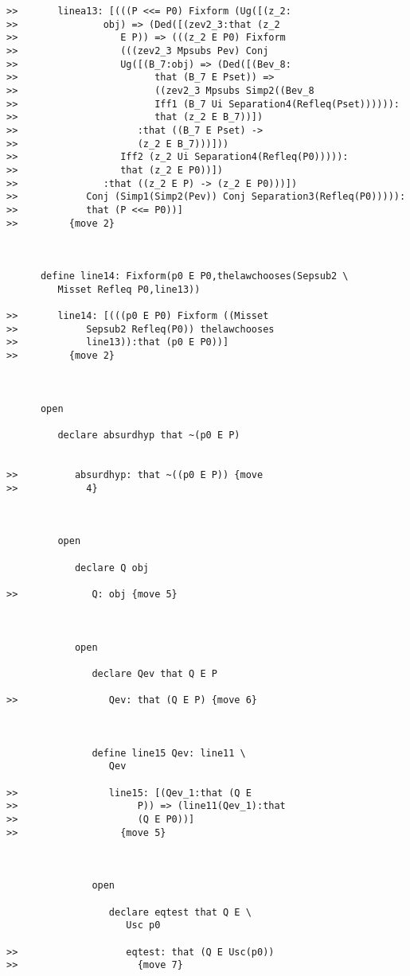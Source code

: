 \documentclass[12pt]{article}
\begin{document}
\begin{verbatim}
>>       linea13: [(((P <<= P0) Fixform (Ug([(z_2:
>>               obj) => (Ded([(zev2_3:that (z_2
>>                  E P)) => (((z_2 E P0) Fixform
>>                  (((zev2_3 Mpsubs Pev) Conj
>>                  Ug([(B_7:obj) => (Ded([(Bev_8:
>>                        that (B_7 E Pset)) =>
>>                        ((zev2_3 Mpsubs Simp2((Bev_8
>>                        Iff1 (B_7 Ui Separation4(Refleq(Pset)))))):
>>                        that (z_2 E B_7))])
>>                     :that ((B_7 E Pset) ->
>>                     (z_2 E B_7)))]))
>>                  Iff2 (z_2 Ui Separation4(Refleq(P0))))):
>>                  that (z_2 E P0))])
>>               :that ((z_2 E P) -> (z_2 E P0)))])
>>            Conj (Simp1(Simp2(Pev)) Conj Separation3(Refleq(P0))))):
>>            that (P <<= P0))]
>>         {move 2}



      define line14: Fixform(p0 E P0,thelawchooses(Sepsub2 \
         Misset Refleq P0,line13))

>>       line14: [(((p0 E P0) Fixform ((Misset
>>            Sepsub2 Refleq(P0)) thelawchooses
>>            line13)):that (p0 E P0))]
>>         {move 2}



      open

         declare absurdhyp that ~(p0 E P)


>>          absurdhyp: that ~((p0 E P)) {move
>>            4}



         open

            declare Q obj

>>             Q: obj {move 5}



            open

               declare Qev that Q E P

>>                Qev: that (Q E P) {move 6}



               define line15 Qev: line11 \
                  Qev

>>                line15: [(Qev_1:that (Q E
>>                     P)) => (line11(Qev_1):that
>>                     (Q E P0))]
>>                  {move 5}



               open

                  declare eqtest that Q E \
                     Usc p0

>>                   eqtest: that (Q E Usc(p0))
>>                     {move 7}




\end{verbatim}
\end{document}
